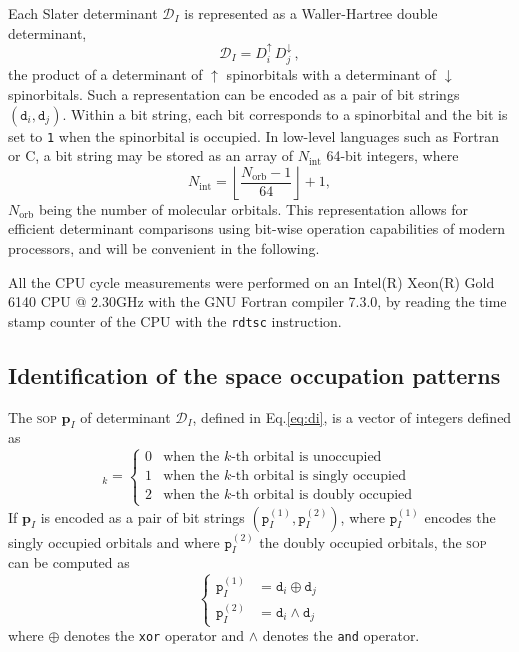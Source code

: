 \documentclass[aip,jcp,reprint,showkeys]{revtex4-1}
\newcommand{\md}{\mathtt{d}}
\newcommand{\mD}{\mathcal{D}}
\newcommand{\mpp}{\mathtt{p}}
\newcommand{\mpv}{\mathbf{p}}
\newcommand{\up}{\uparrow}
\newcommand{\dn}{\downarrow}
\newcommand{\Nint}{{N_\text{int}}}
\newcommand{\Norb}{{N_\text{orb}}}
\newcommand{\one}{{\texttt{1}}}
\newcommand{\sop}{\textsc{sop}}
\begin{document}
Each Slater determinant $\mD_I$ is represented as a Waller-Hartree double
determinant,\cite{Pauncz_1989}
\begin{equation}
 \label{eq:di}
 \mD_I = D_i^\up \, D_j^\dn\, ,
\end{equation}
the product of a determinant of
$\up$ spinorbitals with a determinant of $\dn$ spinorbitals.
Such a representation can be encoded as a pair of bit strings $(\md_i,\md_j)$.
Within a bit string,
each bit corresponds to a spinorbital and the bit is set to \one{} when the
spinorbital is occupied. In low-level languages such as Fortran or C, a bit
string may be stored as an array of $\Nint$ 64-bit integers, where 
\begin{equation}
  \Nint = \left \lfloor \frac{\Norb-1}{64} \right \rfloor + 1,
\end{equation}
$\Norb$ being the number of molecular orbitals.
This representation
allows for efficient determinant comparisons using bit-wise operation 
capabilities of modern processors,\cite{Scemama_2013} and will be convenient
in the following.

All the CPU cycle measurements were performed  on an Intel(R) Xeon(R)
Gold 6140 CPU @ 2.30GHz with the GNU Fortran compiler 7.3.0, by reading
the time stamp counter of the CPU with the \texttt{rdtsc} instruction.


\subsection{Identification of the space occupation patterns}

The {\sop} $\mpv_I$ of determinant $\mD_I$, 
defined in Eq.\eqref{eq:di},
is a vector of integers defined as
\begin{equation}
  [\mpv_I]_k = 
  \begin{cases} 
    0 & \text{when the $k$-th orbital is unoccupied} \\
    1 & \text{when the $k$-th orbital is singly occupied} \\
    2 & \text{when the $k$-th orbital is doubly occupied}
  \end{cases} 
\end{equation}
If $\mpv_I$ is encoded as a pair of bit strings $(\mpp_I^{(1)}, \mpp_I^{(2)})$, where
$\mpp_I^{(1)}$ encodes the singly occupied orbitals and where $\mpp_I^{(2)}$ the doubly
occupied orbitals, the {\sop} can be computed as
\begin{equation}
\label{eq:sop}
\begin{cases}
  \mpp_I^{(1)} & = \md_i \oplus \md_j \\
  \mpp_I^{(2)} & = \md_i \wedge \md_j 
  \end{cases} 
\end{equation}
where $\oplus$ denotes the \texttt{xor} operator and $\wedge$ denotes the
\texttt{and} operator.
\end{document}
